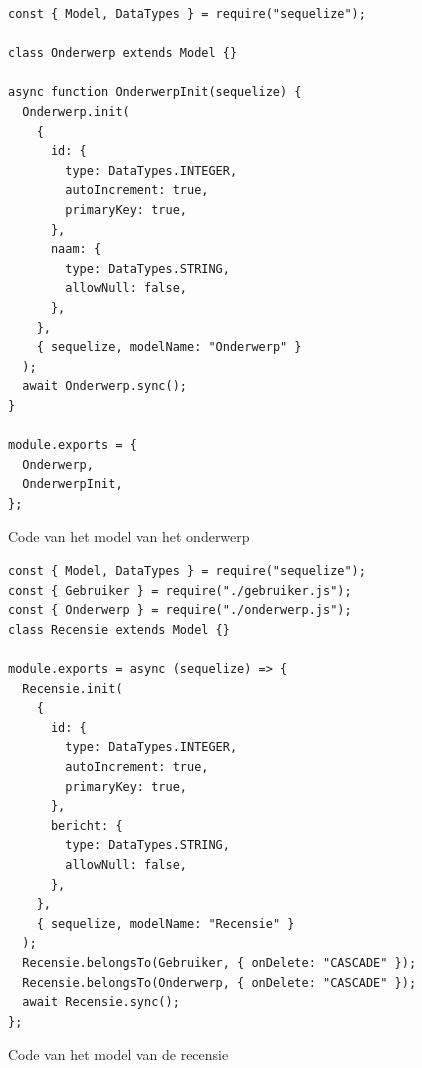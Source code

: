 \begin{listing}[H]
  \centering
  \begin{verbatim}
const { Model, DataTypes } = require("sequelize");

class Onderwerp extends Model {}

async function OnderwerpInit(sequelize) {
  Onderwerp.init(
    {
      id: {
        type: DataTypes.INTEGER,
        autoIncrement: true,
        primaryKey: true,
      },
      naam: {
        type: DataTypes.STRING,
        allowNull: false,
      },
    },
    { sequelize, modelName: "Onderwerp" }
  );
  await Onderwerp.sync();
}

module.exports = {
  Onderwerp,
  OnderwerpInit,
};
\end{verbatim}
\caption[Model onderwerp]{\label{code:Subject}Code van het model van het onderwerp}
\end{listing}

\begin{listing}[H]
  \centering
  \begin{verbatim}
const { Model, DataTypes } = require("sequelize");
const { Gebruiker } = require("./gebruiker.js");
const { Onderwerp } = require("./onderwerp.js");
class Recensie extends Model {}

module.exports = async (sequelize) => {
  Recensie.init(
    {
      id: {
        type: DataTypes.INTEGER,
        autoIncrement: true,
        primaryKey: true,
      },
      bericht: {
        type: DataTypes.STRING,
        allowNull: false,
      },
    },
    { sequelize, modelName: "Recensie" }
  );
  Recensie.belongsTo(Gebruiker, { onDelete: "CASCADE" });
  Recensie.belongsTo(Onderwerp, { onDelete: "CASCADE" });
  await Recensie.sync();
};
\end{verbatim}
\caption[Model recensie]{\label{code:Review}Code van het model van de recensie}
\end{listing}

